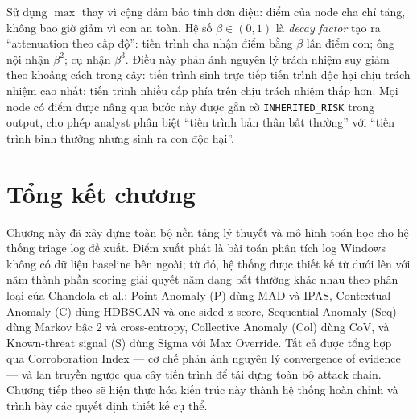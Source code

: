 \documentclass[../main.tex]{subfiles}
\begin{document}
Sử dụng $\max$ thay vì cộng đảm bảo tính đơn điệu: điểm của node cha chỉ tăng, không bao giờ giảm vì con an toàn. Hệ số $\beta \in (0, 1)$ là \textit{decay factor} tạo ra ``attenuation theo cấp độ'': tiến trình cha nhận điểm bằng $\beta$ lần điểm con; ông nội nhận $\beta^2$; cụ nhận $\beta^3$. Điều này phản ánh nguyên lý trách nhiệm suy giảm theo khoảng cách trong cây: tiến trình sinh trực tiếp tiến trình độc hại chịu trách nhiệm cao nhất; tiến trình nhiều cấp phía trên chịu trách nhiệm thấp hơn. Mọi node có điểm được nâng qua bước này được gắn cờ \texttt{INHERITED\_RISK} trong output, cho phép analyst phân biệt ``tiến trình bản thân bất thường'' với ``tiến trình bình thường nhưng sinh ra con độc hại''.

\section{Tổng kết chương}
\label{section:2.6}

Chương này đã xây dựng toàn bộ nền tảng lý thuyết và mô hình toán học cho hệ thống triage log đề xuất. Điểm xuất phát là bài toán phân tích log Windows không có dữ liệu baseline bên ngoài; từ đó, hệ thống được thiết kế từ dưới lên với năm thành phần scoring giải quyết năm dạng bất thường khác nhau theo phân loại của Chandola et al.: Point Anomaly (P) dùng MAD và IPAS, Contextual Anomaly (C) dùng HDBSCAN và one-sided z-score, Sequential Anomaly (Seq) dùng Markov bậc 2 và cross-entropy, Collective Anomaly (Col) dùng CoV, và Known-threat signal (S) dùng Sigma với Max Override. Tất cả được tổng hợp qua Corroboration Index — cơ chế phản ánh nguyên lý convergence of evidence — và lan truyền ngược qua cây tiến trình để tái dựng toàn bộ attack chain. Chương tiếp theo sẽ hiện thực hóa kiến trúc này thành hệ thống hoàn chỉnh và trình bày các quyết định thiết kế cụ thể.

\end{document}
